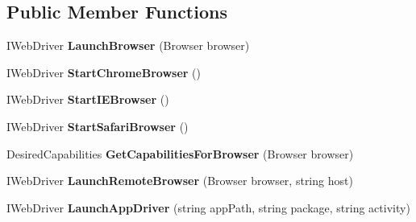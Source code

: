 \subsection*{Public Member Functions}
\begin{DoxyCompactItemize}
\item 
\hypertarget{class_proto_test_1_1_golem_1_1_web_driver_1_1_web_driver_browser_a3ebcbb8bcbcf2da381bfb93da7daa4f4}{I\-Web\-Driver {\bfseries Launch\-Browser} (Browser browser)}\label{class_proto_test_1_1_golem_1_1_web_driver_1_1_web_driver_browser_a3ebcbb8bcbcf2da381bfb93da7daa4f4}

\item 
\hypertarget{class_proto_test_1_1_golem_1_1_web_driver_1_1_web_driver_browser_a2b408579692f470028339e69b2a9fc68}{I\-Web\-Driver {\bfseries Start\-Chrome\-Browser} ()}\label{class_proto_test_1_1_golem_1_1_web_driver_1_1_web_driver_browser_a2b408579692f470028339e69b2a9fc68}

\item 
\hypertarget{class_proto_test_1_1_golem_1_1_web_driver_1_1_web_driver_browser_a328176eeffcc01ffdfd7c2be0e0ed242}{I\-Web\-Driver {\bfseries Start\-I\-E\-Browser} ()}\label{class_proto_test_1_1_golem_1_1_web_driver_1_1_web_driver_browser_a328176eeffcc01ffdfd7c2be0e0ed242}

\item 
\hypertarget{class_proto_test_1_1_golem_1_1_web_driver_1_1_web_driver_browser_a1960e7cdbccbd278e0bd8c90c4d3cdf1}{I\-Web\-Driver {\bfseries Start\-Safari\-Browser} ()}\label{class_proto_test_1_1_golem_1_1_web_driver_1_1_web_driver_browser_a1960e7cdbccbd278e0bd8c90c4d3cdf1}

\item 
\hypertarget{class_proto_test_1_1_golem_1_1_web_driver_1_1_web_driver_browser_ad31ceac651233d0c2a1b02a0039ce05d}{Desired\-Capabilities {\bfseries Get\-Capabilities\-For\-Browser} (Browser browser)}\label{class_proto_test_1_1_golem_1_1_web_driver_1_1_web_driver_browser_ad31ceac651233d0c2a1b02a0039ce05d}

\item 
\hypertarget{class_proto_test_1_1_golem_1_1_web_driver_1_1_web_driver_browser_ab6395ff6eaf363b7a1ab64d9e91f2380}{I\-Web\-Driver {\bfseries Launch\-Remote\-Browser} (Browser browser, string host)}\label{class_proto_test_1_1_golem_1_1_web_driver_1_1_web_driver_browser_ab6395ff6eaf363b7a1ab64d9e91f2380}

\item 
\hypertarget{class_proto_test_1_1_golem_1_1_web_driver_1_1_web_driver_browser_a7cc2251428e20c24ffda9df52e384d2e}{I\-Web\-Driver {\bfseries Launch\-App\-Driver} (string app\-Path, string package, string activity)}\label{class_proto_test_1_1_golem_1_1_web_driver_1_1_web_driver_browser_a7cc2251428e20c24ffda9df52e384d2e}

\end{DoxyCompactItemize}
